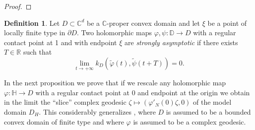\documentclass[11pt, reqno]{amsart}
\numberwithin{equation}{section}
\theoremstyle{definition}
\newtheorem{definition}[theorem]{Definition}
\newcommand{\C}{\mathbb{C}}
\newcommand{\D}{\mathbb{D}}
\newcommand{\R}{\mathbb{R}}
\renewcommand{\H}{\mathbb{H}}
\begin{document}
{\begin{proof}
		\end{proof}
		
		\begin{definition}
			Let $D\subset\C^d$ be a $\C$-proper convex domain and let $\xi$ be a point of locally finite type in $\partial D$.
			Two holomorphic maps  $\varphi, \psi\colon \D\to D$  with a regular contact point at 1 and with endpoint $\xi$ are {\sl strongly asymptotic}
			if there exists
			$T\in \R$  such that
			$$\displaystyle \lim_{t\to +\infty}k_D(\tilde \varphi(t), \tilde\psi(t+T))=0.$$	
		\end{definition}
		
		
		
		
		
		
		In the next proposition we prove that if we rescale any holomorphic map $\varphi:\H\to D$ with a  regular contact point at $0$ and endpoint at the origin we obtain in the limit the ``slice'' complex geodesic $\zeta\mapsto(\varphi'_N(0)\zeta,0)$ of the model domain $D_H$.
		This considerably generalizes  \cite[Lemma 5.13]{AFGG}, where  $D$ is assumed  to be a bounded convex domain of  finite type and where $\varphi$ is assumed to be a complex geodesic.
		
}
\end{document}
